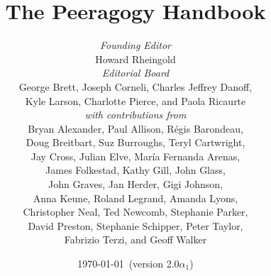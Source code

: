 \documentclass[ebook, 12pt, twoside]{memoir}
\begin{document}
\sloppy 
{}
\title{The Peeragogy Handbook\\[.5in]}
\author{
\emph{Founding Editor}\\
{\small Howard Rheingold}\\[.3in]
\emph{Editorial Board}\\
{\small George Brett, Joseph Corneli, Charles Jeffrey Danoff,}\\
{\small Kyle Larson, Charlotte Pierce, and Paola Ricaurte}\\[.3in]

\emph{with contributions from} \\
{\small Bryan Alexander, Paul Allison, R\'egis Barondeau,} \\
{\small Doug Breitbart, Suz Burroughs, Teryl Cartwright,}\\ 
{\small Jay Cross, Julian Elve, Mar\'ia Fernanda Arenas,}\\
{\small James Folkestad, Kathy Gill, John Glass,}\\
{\small John Graves, Jan Herder, Gigi Johnson,} \\
{\small Anna Keune, Roland Legrand, Amanda Lyons,} \\
{\small Christopher Neal, Ted Newcomb, Stephanie Parker,} \\
{\small David Preston, Stephanie Schipper, Peter Taylor,} \\
{\small Fabrizio Terzi, and Geoff Walker}
}
\date{\today\ (version 2.0$\alpha_1$)}
\maketitle
\thispagestyle{empty}
\end{document}
